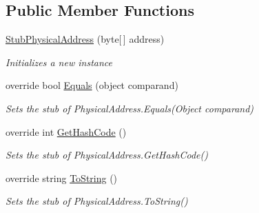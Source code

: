 \subsection*{Public Member Functions}
\begin{DoxyCompactItemize}
\item 
\hyperlink{class_system_1_1_net_1_1_network_information_1_1_fakes_1_1_stub_physical_address_a8b5a71f1bdc1c82f9047457cb1b8973d}{Stub\-Physical\-Address} (byte\mbox{[}$\,$\mbox{]} address)
\begin{DoxyCompactList}\small\item\em Initializes a new instance\end{DoxyCompactList}\item 
override bool \hyperlink{class_system_1_1_net_1_1_network_information_1_1_fakes_1_1_stub_physical_address_a00afae2b3be73ecadb46c6063f1c1da2}{Equals} (object comparand)
\begin{DoxyCompactList}\small\item\em Sets the stub of Physical\-Address.\-Equals(\-Object comparand)\end{DoxyCompactList}\item 
override int \hyperlink{class_system_1_1_net_1_1_network_information_1_1_fakes_1_1_stub_physical_address_aa57166cc36358d19638fd61be38f1096}{Get\-Hash\-Code} ()
\begin{DoxyCompactList}\small\item\em Sets the stub of Physical\-Address.\-Get\-Hash\-Code()\end{DoxyCompactList}\item 
override string \hyperlink{class_system_1_1_net_1_1_network_information_1_1_fakes_1_1_stub_physical_address_aa8496ef13f493ee746ce646af3b851a6}{To\-String} ()
\begin{DoxyCompactList}\small\item\em Sets the stub of Physical\-Address.\-To\-String()\end{DoxyCompactList}\end{DoxyCompactItemize}
